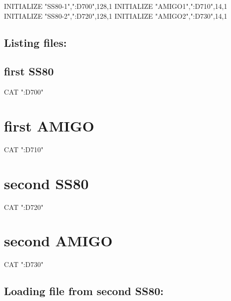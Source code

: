 \begin{DoxyPre}
  INITIALIZE "SS80-1",":D700",128,1
  INITIALIZE "AMIGO1",":D710",14,1
  INITIALIZE "SS80-2",":D720",128,1
  INITIALIZE "AMIGO2",":D730",14,1\end{DoxyPre}



\begin{DoxyPre}\section*{Listing files:}\end{DoxyPre}



\begin{DoxyPre}
\section*{first SS80}\end{DoxyPre}



\begin{DoxyPre}
  CAT ":D700"
\section*{first AMIGO}\end{DoxyPre}



\begin{DoxyPre}
  CAT ":D710"
\section*{second SS80}\end{DoxyPre}



\begin{DoxyPre}
  CAT ":D720"
\section*{second AMIGO}\end{DoxyPre}



\begin{DoxyPre}
  CAT ":D730"\end{DoxyPre}



\begin{DoxyPre}\section*{Loading file from second SS80:}\end{DoxyPre}



